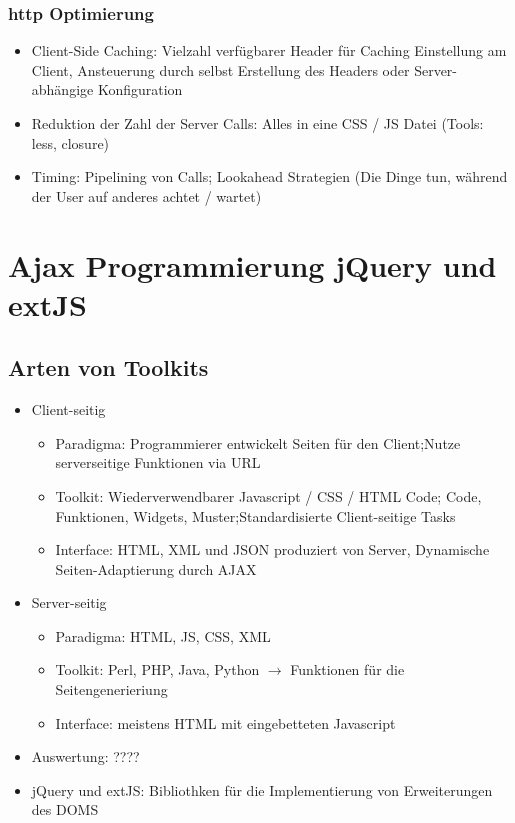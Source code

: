 \documentclass{article} %
\begin{document}
	\subsubsection{http Optimierung}
	\begin{itemize}
		\item Client-Side Caching: Vielzahl verfügbarer Header für Caching Einstellung am Client, Ansteuerung durch selbst Erstellung des Headers oder Server-abhängige Konfiguration
		\item Reduktion der Zahl der Server Calls: Alles in eine CSS / JS Datei (Tools: less, closure)
		\item Timing: Pipelining von Calls; Lookahead Strategien (Die Dinge tun, während der User auf anderes achtet / wartet)
	\end{itemize}
\section{Ajax Programmierung jQuery und extJS}
	\subsection{Arten von Toolkits}
	\begin{itemize}
		\item Client-seitig
			\begin{itemize}
				\item Paradigma: Programmierer entwickelt Seiten für den Client;Nutze serverseitige Funktionen via URL
				\item Toolkit: Wiederverwendbarer Javascript / CSS / HTML Code; Code, Funktionen, Widgets, Muster;Standardisierte Client-seitige Tasks
				\item Interface: HTML, XML und JSON produziert von Server, Dynamische Seiten-Adaptierung durch AJAX
			\end{itemize}
		\item Server-seitig
			\begin{itemize}
				\item Paradigma: HTML, JS, CSS, XML
				\item Toolkit: Perl, PHP, Java, Python $\rightarrow$ Funktionen für die Seitengenerieriung
				\item Interface: meistens HTML mit eingebetteten Javascript
			\end{itemize}
		\item Auswertung: ????
		\item jQuery und extJS: Bibliothken für die Implementierung von Erweiterungen des DOMS
	\end{itemize}
\end{document}
